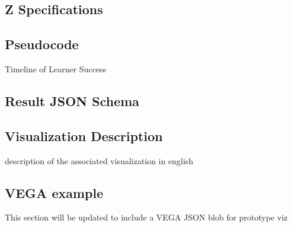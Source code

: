 \documentclass{article}
\begin{document}
  \subsection{Z Specifications}


  \subsection{Pseudocode}
  \begin{algorithm}[H]
    \SetAlgoLined
    \caption{Timeline of Learner Success}
  \end{algorithm}
  \subsection{Result JSON Schema}
  \subsection{Visualization Description}
  description of the associated visualization in english
  \subsection{VEGA example}
  This section will be updated to include a VEGA JSON blob for prototype viz
\end{document}
